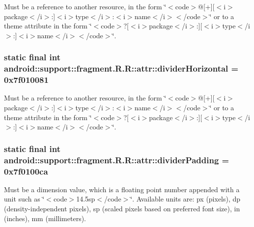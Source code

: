Must be a reference to another resource, in the form \char`\"{}$<$code$>$@\mbox{[}+\mbox{]}\mbox{[}$<$i$>$package$<$/i$>$:\mbox{]}$<$i$>$type$<$/i$>$:$<$i$>$name$<$/i$>$$<$/code$>$\char`\"{} or to a theme attribute in the form \char`\"{}$<$code$>$?\mbox{[}$<$i$>$package$<$/i$>$:\mbox{]}\mbox{[}$<$i$>$type$<$/i$>$:\mbox{]}$<$i$>$name$<$/i$>$$<$/code$>$\char`\"{}. \hypertarget{classandroid_1_1support_1_1fragment_1_1_r_1_1attr_6e88dcd202283c2370ef5a32b5356363}{
\subsubsection[{dividerHorizontal}]{\setlength{\rightskip}{0pt plus 5cm}static final int android::support::fragment.R.R::attr::dividerHorizontal = 0x7f010081}}
\label{classandroid_1_1support_1_1fragment_1_1_r_1_1attr_6e88dcd202283c2370ef5a32b5356363}


Must be a reference to another resource, in the form \char`\"{}$<$code$>$@\mbox{[}+\mbox{]}\mbox{[}$<$i$>$package$<$/i$>$:\mbox{]}$<$i$>$type$<$/i$>$:$<$i$>$name$<$/i$>$$<$/code$>$\char`\"{} or to a theme attribute in the form \char`\"{}$<$code$>$?\mbox{[}$<$i$>$package$<$/i$>$:\mbox{]}\mbox{[}$<$i$>$type$<$/i$>$:\mbox{]}$<$i$>$name$<$/i$>$$<$/code$>$\char`\"{}. \hypertarget{classandroid_1_1support_1_1fragment_1_1_r_1_1attr_a072f534e0883205b12ce587b6090bd7}{
\subsubsection[{dividerPadding}]{\setlength{\rightskip}{0pt plus 5cm}static final int android::support::fragment.R.R::attr::dividerPadding = 0x7f0100ca}}
\label{classandroid_1_1support_1_1fragment_1_1_r_1_1attr_a072f534e0883205b12ce587b6090bd7}


Must be a dimension value, which is a floating point number appended with a unit such as \char`\"{}$<$code$>$14.5sp$<$/code$>$\char`\"{}. Available units are: px (pixels), dp (density-independent pixels), sp (scaled pixels based on preferred font size), in (inches), mm (millimeters). 

